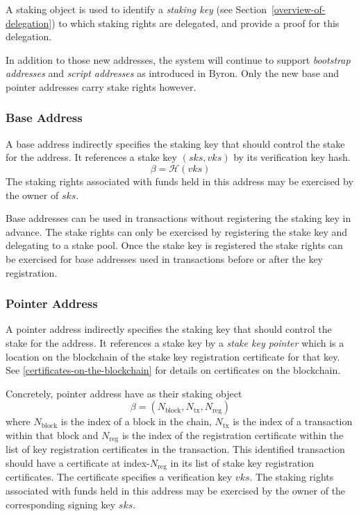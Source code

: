\documentclass[11pt,a4paper]{article}
\begin{document}
A staking object is used to identify a \emph{staking key} (see
Section~\ref{overview-of-delegation}) to which staking rights are delegated,
and provide a proof for this delegation.

In addition to those new addresses, the system will continue to support
\emph{bootstrap addresses} and \emph{script addresses} as introduced in
Byron. Only the new base and pointer addresses carry stake rights
however.

\subsubsection{Base Address}
\label{base-address}

A base address indirectly specifies the staking key that should
control the stake for the address. It references a stake key
\((sks, vks)\) by its verification key hash.
\[
\beta = \mathcal{H}(vks)
\]
The staking rights associated with funds held in this address may be
exercised by the owner of \(sks\).

Base addresses can be used in transactions without registering the
staking key in advance. The stake rights can only be exercised by
registering the stake key and delegating to a stake pool. Once the
stake key is registered the stake rights can be exercised for base
addresses used in transactions before or after the key registration.

\subsubsection{Pointer Address}
\label{pointer-address}

A pointer address indirectly specifies the staking key that should
control the stake for the address. It references a stake key by a
\emph{stake key pointer} which is a location on the blockchain of the
stake key registration certificate for that key. See
\cref{certificates-on-the-blockchain} for details on certificates on the
blockchain.

Concretely, pointer address have as their staking object
\[
\beta = (N_\text{block}, N_\text{tx}, N_\text{reg})
\]
where \(N_\text{block}\) is the index of a block in the chain,
\(N_\text{tx}\) is the index of a transaction within that block and
\(N_\text{reg}\) is the index of the registration certificate within
the list of  key registration certificates in the transaction. This
identified transaction should have a certificate at index-\(N_\text{reg}\)
in its list of stake key registration certificates. The certificate
specifies a verification key \(vks\). The staking rights associated
with funds held in this address may be exercised by the owner of the
corresponding signing key \(sks\).
\end{document}
